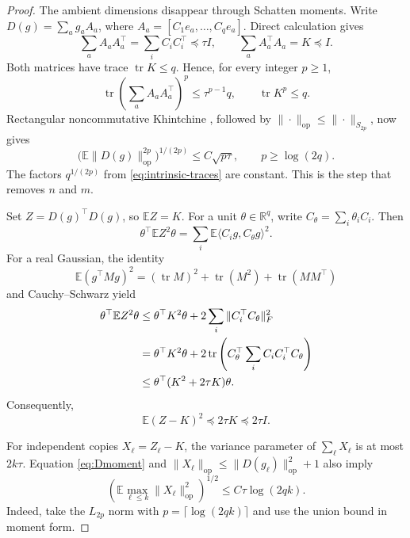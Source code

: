 \documentclass[twoside]{article}
\newcommand{\E}{\mathbb E}
\newcommand{\R}{\mathbb R}
\newcommand{\tr}{\operatorname{tr}}
\newcommand{\op}{\mathrm{op}}
\begin{document}
\begin{proof}
The ambient dimensions disappear through Schatten moments. Write $D(g)=\sum_a g_aA_a$, where $A_a=[C_1e_a,\ldots,C_qe_a]$. Direct calculation gives
\begin{equation}
 \sum_aA_aA_a^\top=\sum_iC_iC_i^\top\preceq\tau I,
 \qquad \sum_aA_a^\top A_a=K\preceq I.
 \label{eq:two-variance-proxies}
\end{equation}
Both matrices have trace $\tr K\le q$. Hence, for every integer $p\ge1$,
\begin{equation}
 \tr\left(\sum_aA_aA_a^\top\right)^p\le\tau^{p-1}q,
 \qquad \tr K^p\le q.
 \label{eq:intrinsic-traces}
\end{equation}
Rectangular noncommutative Khintchine \citep{buchholz2001operator}, followed by $\|\cdot\|_\op\le\|\cdot\|_{S_{2p}}$, now gives
\begin{equation}
 \bigl(\E\|D(g)\|_\op^{2p}\bigr)^{1/(2p)}
 \le C\sqrt{p\tau}, \qquad p\ge\log(2q).
 \label{eq:Dmoment}
\end{equation}
The factors $q^{1/(2p)}$ from \eqref{eq:intrinsic-traces} are constant. This is the step that removes $n$ and $m$.

Set $Z=D(g)^\top D(g)$, so $\E Z=K$. For a unit $\theta\in\R^q$, write $C_\theta=\sum_i\theta_iC_i$. Then
\begin{equation}
 \theta^\top\E Z^2\theta
 =\sum_i\E\langle C_ig,C_\theta g\rangle^2.
 \label{eq:Z-rayleigh}
\end{equation}
For a real Gaussian, the identity \[ \E(g^\top Mg)^2=(\tr M)^2+\tr(M^2)+\tr(MM^\top) \] and Cauchy--Schwarz yield
\begin{align}
 \theta^\top\E Z^2\theta
 &\le\theta^\top K^2\theta
 +2\sum_i\|C_i^\top C_\theta\|_F^2\notag\\
 &=\theta^\top K^2\theta
 +2\tr\left(C_\theta^\top\sum_iC_iC_i^\top C_\theta\right)\notag\\
 &\le\theta^\top(K^2+2\tau K)\theta.
 \label{eq:Z-fourth}
\end{align}
Consequently,
\begin{equation}
 \E(Z-K)^2\preceq2\tau K\preceq2\tau I.
 \label{eq:Zvariance}
\end{equation}

For independent copies $X_\ell=Z_\ell-K$, the variance parameter of $\sum_\ell X_\ell$ is at most $2k\tau$. Equation \eqref{eq:Dmoment} and $\|X_\ell\|_\op\le\|D(g_\ell)\|_\op^2+1$ also imply
\begin{equation}
 \left(\E\max_{\ell\le k}\|X_\ell\|_\op^2\right)^{1/2}
 \le C\tau\log(2qk).
 \label{eq:max-summand}
\end{equation}
Indeed, take the $L_{2p}$ norm with $p=\lceil\log(2qk)\rceil$ and use the union bound in moment form.


\end{proof}
\end{document}

